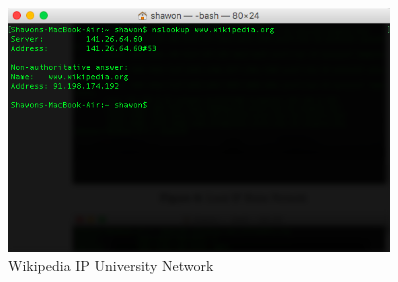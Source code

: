 \documentclass{WeSTassignment}
\begin{document}
\begin{figure}[bp!]
  \centering
  \includegraphics[width=0.9\textwidth]{uni_wiki_ip.png}
   \caption{Wikipedia IP University Network}
     \label{fig:ipaddress}
\end{figure}
\end{document}
